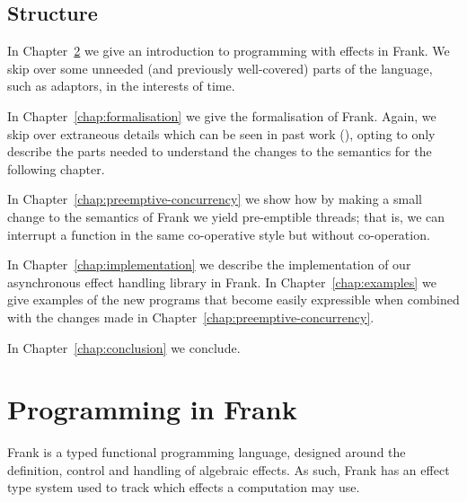 \documentclass[msc,deptreport,cs]{infthesis} %
\begin{document}

\section{Structure}

In Chapter~\ref{chap:programming-in-frank} we give an introduction to
programming with effects in Frank. We skip over some unneeded (and previously
well-covered) parts of the language, such as adaptors, in the interests of time.

In Chapter~\ref{chap:formalisation} we give the formalisation of Frank. Again,
we skip over extraneous details which can be seen in past work
(\cite{convent2020doo}), opting to only describe the parts needed to understand
the changes to the semantics for the following chapter.

In Chapter~\ref{chap:preemptive-concurrency} we show how by making a small
change to the semantics of Frank we yield pre-emptible threads; that is, we can
interrupt a function in the same co-operative style but without co-operation.

In Chapter~\ref{chap:implementation} we describe the implementation of our
asynchronous effect handling library in Frank. In Chapter~\ref{chap:examples} we
give examples of the new programs that become easily expressible when combined
with the changes made in Chapter~\ref{chap:preemptive-concurrency}.

In Chapter~\ref{chap:conclusion} we conclude.



\chapter{Programming in Frank}
\label{chap:programming-in-frank}

Frank is a typed functional programming language, designed around the
definition, control and handling of algebraic effects. As such, Frank has an
effect type system used to track which effects a computation may use.
\end{document}
